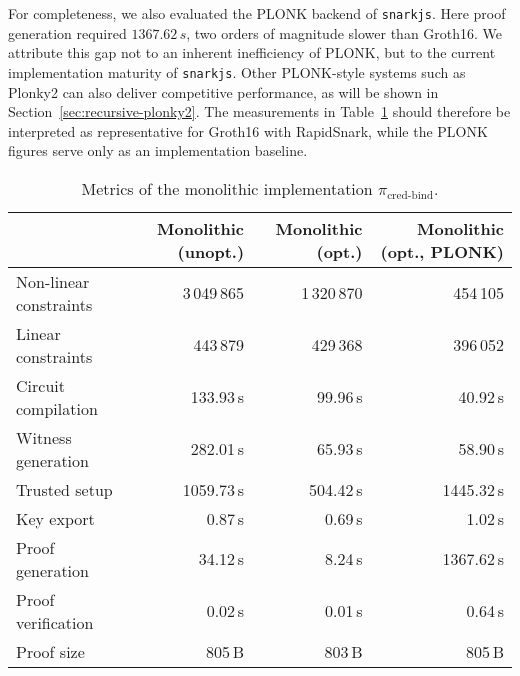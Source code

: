 For completeness, we also evaluated the PLONK backend of \texttt{snarkjs}. Here proof generation required $1367.62\,s$, two orders of magnitude slower than Groth16. We attribute this gap not to an inherent inefficiency of PLONK, but to the current implementation maturity of \texttt{snarkjs}. Other PLONK-style systems such as Plonky2 can also deliver competitive performance, as will be shown in Section~\ref{sec:recursive-plonky2}. The measurements in Table~\ref{tab:monolithic} should therefore be interpreted as representative for Groth16 with RapidSnark, while the PLONK figures serve only as an implementation baseline.

\begin{table}[t]
	\centering
	\begin{tabular}{lrrr}
		\toprule
		& \textbf{Monolithic (unopt.)} & \textbf{Monolithic (opt.)} & \textbf{Monolithic (opt., PLONK)} \\
		\midrule
		Non-linear constraints & 3\,049\,865 & 1\,320\,870 & 454\,105 \\
		Linear constraints     &   443\,879 &   429\,368 & 396\,052 \\
		\midrule
		Circuit compilation    & 133.93\,s  & 99.96\,s   & 40.92\,s \\
		Witness generation     & 282.01\,s  & 65.93\,s   & 58.90\,s \\
		Trusted setup          & 1059.73\,s & 504.42\,s  & 1445.32\,s \\
		Key export             & 0.87\,s    & 0.69\,s    & 1.02\,s \\
		Proof generation       & 34.12\,s   & 8.24\,s    & 1367.62\,s \\
		Proof verification     & 0.02\,s    & 0.01\,s    & 0.64\,s \\
		Proof size             & 805\,B     & 803\,B     & 805\,B \\
		\bottomrule
	\end{tabular}
	\caption{Metrics of the monolithic implementation $\pi_{\text{cred-bind}}$.}
	\label{tab:monolithic}
\end{table}

